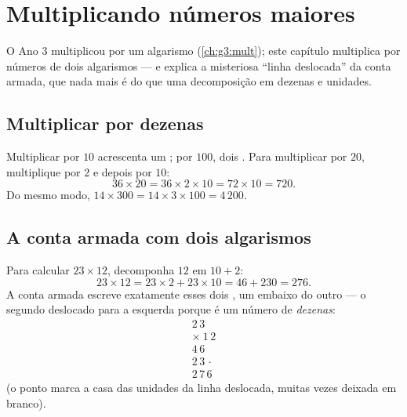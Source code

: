 \chapter{Multiplicando números maiores}\label{ch:g4:mult}

O Ano 3 multiplicou por um algarismo (\cref{ch:g3:mult}); este
capítulo multiplica por números de dois algarismos --- e explica a
misteriosa ``linha deslocada'' da conta armada, que nada mais é do
que uma decomposição em dezenas e unidades.

\section{Multiplicar por dezenas}

\begin{proposition}\label{prop:g4:mult:tens}
Multiplicar por $10$ acrescenta um ; por $100$, dois . Para
multiplicar por $20$, multiplique por $2$ e depois por $10$:
\[
36 \times 20 = 36 \times 2 \times 10 = 72 \times 10 = 720 .
\]
Do mesmo modo, $14 \times 300 = 14 \times 3 \times 100 = 4\,200$.
\end{proposition}
\admitted

\section{A conta armada com dois algarismos}

\begin{example}\label{ex:g4:mult:why}
Para calcular $23 \times 12$, decomponha $12$ em $10 + 2$:
\[
23 \times 12 = 23 \times 2 + 23 \times 10 = 46 + 230 = 276 .
\]
A conta armada escreve exatamente esses dois , um embaixo do
outro --- o segundo deslocado para a esquerda porque é um número de
\emph{dezenas}:
\[
\begin{array}{r}
2\,3 \\
\times\ 1\,2 \\
\hline
4\,6 \\
2\,3\,\cdot \\
\hline
2\,7\,6
\end{array}
\]
(o ponto marca a casa das unidades da linha deslocada, muitas vezes
deixada em branco).
\end{example}

